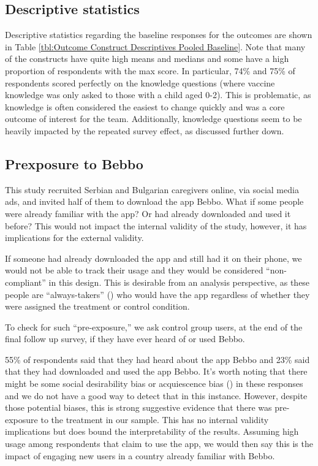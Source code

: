 \documentclass{article}
\begin{document}


\subsection{Descriptive statistics}

Descriptive statistics regarding the baseline responses for the outcomes are shown in Table \ref{tbl:Outcome Construct Descriptives Pooled Baseline}. Note that many of the constructs have quite high means and medians and some have a high proportion of respondents with the max score. In particular, 74\% and 75\% of respondents scored perfectly on the knowledge questions (where vaccine knowledge was only asked to those with a child aged 0-2). This is problematic, as knowledge is often considered the easiest to change quickly and was a core outcome of interest for the team. Additionally, knowledge questions seem to be heavily impacted by the repeated survey effect, as discussed further down.



\subsection{Prexposure to Bebbo}

This study recruited Serbian and Bulgarian caregivers online, via social media ads, and invited half of them to download the app Bebbo. What if some people were already familiar with the app? Or had already downloaded and used it before? This would not impact the internal validity of the study, however, it has implications for the external validity.

If someone had already downloaded the app and still had it on their phone, we would not be able to track their usage and they would be considered “non-compliant” in this design. This is desirable from an analysis perspective, as these people are “always-takers” (\cite{Imbens2015}) who would have the app regardless of whether they were assigned the treatment or control condition.

To check for such “pre-exposure,” we ask control group users, at the end of the final follow up survey, if they have ever heard of or used Bebbo.

55\% of respondents said that they had heard about the app Bebbo and 23\% said that they had downloaded and used the app Bebbo. It’s worth noting that there might be some social desirability bias or acquiescence bias (\cite{Stantcheva2023}) in these responses and we do not have a good way to detect that in this instance. However, despite those potential biases, this is strong suggestive evidence that there was pre-exposure to the treatment in our sample. This has no internal validity implications but does bound the interpretability of the results. Assuming high usage among respondents that claim to use the app, we would then say this is the impact of engaging new users in a country already familiar with Bebbo.
\end{document}
